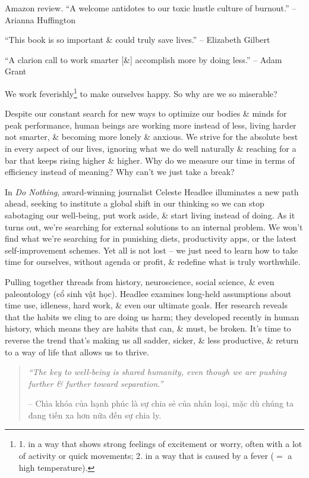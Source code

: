 \documentclass{article}
\begin{document}
\begin{enumerate}
	{\sf Amazon review.} ``A welcome antidotes to our toxic hustle culture of burnout.'' -- {\sc Arianna Huffington}
	
	``This book is so important \& could truly save lives.'' -- {\sc Elizabeth Gilbert}
	
	``A clarion call to work smarter [\&] accomplish more by doing less.'' -- {\sc Adam Grant}
	
	We work feverishly\footnote{1. in a way that shows strong feelings of excitement or worry, often with a lot of activity or quick movements; 2. in a way that is caused by a fever ($=$ a high temperature).} to make ourselves happy. So why are we so miserable?
	
	Despite our constant search for new ways to optimize our bodies \& minds for peak performance, human beings are working more instead of less, living harder not smarter, \& becoming more lonely \& anxious. We strive for the absolute best in every aspect of our lives, ignoring what we do well naturally \& reaching for a bar that keeps rising higher \& higher. Why do we measure our time in terms of efficiency instead of meaning? Why can't we just take a break?
	
	In {\it Do Nothing}, award-winning journalist {\sc Celeste Headlee} illuminates a new path ahead, seeking to institute a global shift in our thinking so we can stop sabotaging our well-being, put work aside, \& start living instead of doing. As it turns out, we're searching for external solutions to an internal problem. We won't find what we're searching for in punishing diets, productivity apps, or the latest self-improvement schemes. Yet all is not lost -- we just need to learn how to take time for ourselves, without agenda or profit, \& redefine what is truly worthwhile.
	
	Pulling together threads from history, neuroscience, social science, \& even paleontology (cổ sinh vật học). {\sc Headlee} examines long-held assumptions about time use, idleness, hard work, \& even our ultimate goals. Her research reveals that the habits we cling to are doing us harm; they developed recently in human history, which means they are habits that can, \& must, be broken. It's time to reverse the trend that's making us all sadder, sicker, \& less productive, \& return to a way of life that allows us to thrive.
	\begin{quotation}
		{\it``The key to well-being is shared humanity, even though we are pushing further \& further toward separation.''}
		
		-- Chìa khóa của hạnh phúc là sự chia sẻ của nhân loại, mặc dù chúng ta đang tiến xa hơn nữa đến sự chia ly.
		

\end{quotation}
\end{enumerate}
\end{document}
